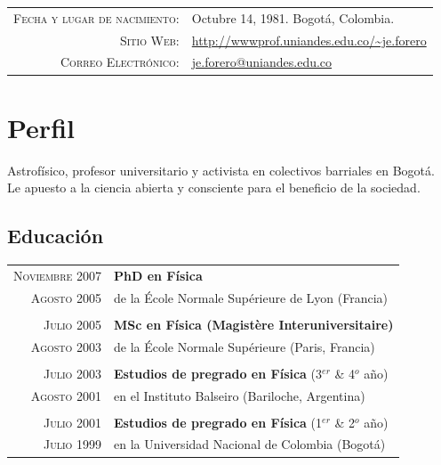 \documentclass[a4paper,10pt]{article} %
\begin{document}
\pagestyle{empty} %




\par{ \bigskip\par} %


\begin{tabular}{rl}
\textsc{Fecha y lugar de nacimiento:} & Octubre 14, 1981. Bogotá, Colombia.\\
\textsc{Sitio Web:} & \url{http://wwwprof.uniandes.edu.co/~je.forero}\\
\textsc{Correo Electrónico:} & \href{mailto:je.forero@uniandes.edu.co}{je.forero@uniandes.edu.co}\\
\end{tabular}


\color{red}
\section{Perfil}
\color{black}

Astrof\'isico, profesor universitario y activista en colectivos barriales en Bogotá. \\
Le apuesto a la ciencia abierta y consciente para el beneficio de la sociedad.
\color{red}
\subsection{Educación}
\color{black}


\begin{tabular}{rl}	
\textsc{Noviembre 2007} & {\bf PhD en Física}\\
\textsc{Agosto 2005}& de la \'Ecole Normale Sup\'erieure de Lyon (Francia) \\
&\\
\textsc{Julio 2005} & {\bf MSc en Física (Magist\`ere Interuniversitaire)}\\  
\textsc{Agosto 2003}& de la \'Ecole Normale Sup\'erieure (Paris, Francia) \\
&\\
\textsc{Julio 2003} & {\bf Estudios de pregrado en Física} (3$^{er}$ \& 4$^{o}$ año)\\
\textsc{Agosto 2001} & en el Instituto Balseiro (Bariloche, Argentina)\\
&\\
\textsc{Julio 2001}  & {\bf Estudios de pregrado en Física} (1$^{er}$ \& 2$^{o}$ año)\\
\textsc{Julio 1999}& en la Universidad Nacional de Colombia (Bogotá)\\
\end{tabular}
\end{document}
